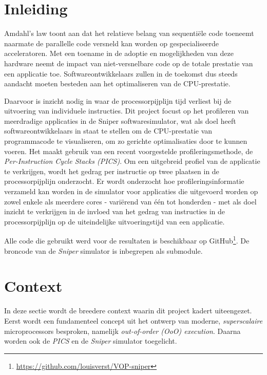 \documentclass[12pt,a4paper,faculty=ea,language=nl]{ugent-doc}
\begin{document}
\maketitle

{\hypersetup{hidelinks}\tableofcontents}
\newpage

\section{Inleiding}
Amdahl's law toont aan dat het relatieve belang van sequentiële code toeneemt naarmate de parallelle code versneld kan worden op gespecialiseerde acceleratoren. Met een toename in de adoptie en mogelijkheden van deze hardware neemt de impact van niet-versnelbare code op de totale prestatie van een applicatie toe. Softwareontwikkelaars zullen in de toekomst dus steeds aandacht moeten besteden aan het optimaliseren van de CPU-prestatie.

Daarvoor is inzicht nodig in waar de processorpijplijn tijd verliest bij de uitvoering van individuele instructies. Dit project focust op het profileren van meerdradige applicaties in de Sniper softwaresimulator, wat als doel heeft softwareontwikkelaars in staat te stellen om de CPU-prestatie van programmacode te visualiseren, om zo gerichte optimalisaties door te kunnen voeren. Het maakt gebruik van een recent voorgestelde profileringsmethode, de \textit{Per-Instruction Cycle Stacks (PICS)}. Om een uitgebreid profiel van de applicatie te verkrijgen, wordt het gedrag per instructie op twee plaatsen in de processorpijplijn onderzocht. Er wordt onderzocht hoe profileringsinformatie verzameld kan worden in de simulator voor applicaties die uitgevoerd worden op zowel enkele als meerdere cores - variërend van één tot honderden - met als doel inzicht te verkrijgen in de invloed van het gedrag van instructies in de processorpijplijn op de uiteindelijke uitvoeringstijd van een applicatie.

Alle code die gebruikt werd voor de resultaten is beschikbaar op GitHub\footnote{\url{https://github.com/louisverst/VOP-sniper}}. De broncode van de \textit{Sniper} simulator is inbegrepen als submodule.


\newpage


\section{Context}
In deze sectie wordt de breedere context waarin dit project kadert uiteengezet. Eerst wordt een fundamenteel concept uit het ontwerp van moderne, \textit{superscalaire} microprocessors besproken, namelijk \textit{out-of-order (OoO) execution}. Daarna worden ook de \textit{PICS} en de \textit{Sniper} simulator toegelicht.
\end{document}
